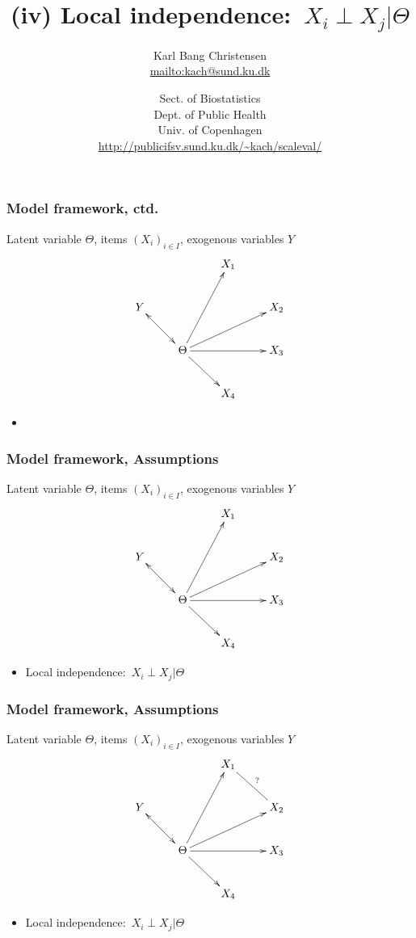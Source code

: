 \documentclass{beamer}
\title{(iv)  Local independence:\ $X_i\perp X_j|\Theta$}
\author{Karl Bang Christensen \\ \href{mailto:kach@sund.ku.dk}{mailto:kach@sund.ku.dk}}
\date{Sect. of Biostatistics\\Dept. of Public Health\\Univ. of Copenhagen\\ \url{http://publicifsv.sund.ku.dk/~kach/scaleval/}}
\begin{document}
\maketitle

\begin{frame}\frametitle{Model framework, ctd.}
Latent variable $\Theta$, items $(X_i)_{i\in I}$, exogenous variables $Y$
$$
\xymatrix{
            &                    &X_1\\
Y\ar@{<->}[rd]&                    &   &X_2\\
            &\Theta\ar@{->}[uur]
                  \ar@{->}[urr]
                  \ar@{->}[rr]
                  \ar@{->}[rd]  &   &X_3\\
            &                   &X_4\\
}
$$
\begin{itemize}
\item[]
\end{itemize}
\end{frame}


\begin{frame}\frametitle{Model framework, Assumptions}
Latent variable $\Theta$, items $(X_i)_{i\in I}$, exogenous variables $Y$
$$
\xymatrix{
            &                    &X_1\\
Y\ar@{<->}[rd]&                    &   &X_2\\
            &\Theta\ar@{->}[uur]
                  \ar@{->}[urr]
                  \ar@{->}[rr]
                  \ar@{->}[rd]  &   &X_3\\
            &                   &X_4\\
}
$$
\begin{itemize}
\item[(iv)] Local independence:\ $X_i\perp X_j|\Theta$
\end{itemize}
\end{frame}


\begin{frame}\frametitle{Model framework, Assumptions}
Latent variable $\Theta$, items $(X_i)_{i\in I}$, exogenous variables $Y$
$$
\xymatrix{
            &                    &X_1\ar@{-}[dr]^{?}\\
Y\ar@{<->}[rd]&                    &   &X_2\\
            &\Theta\ar@{->}[uur]
                  \ar@{->}[urr]
                  \ar@{->}[rr]
                  \ar@{->}[rd]  &   &X_3\\
            &                   &X_4\\
}
$$
\begin{itemize}
\item[(iv)] Local independence:\ $X_i\perp X_j|\Theta$
\end{itemize}
\end{frame}
\end{document}
